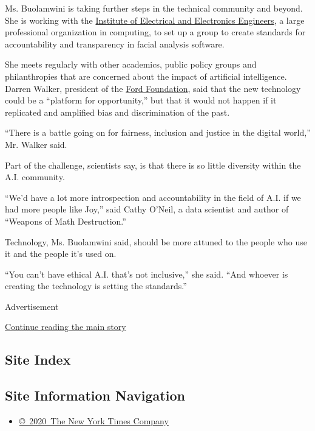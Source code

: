 Ms. Buolamwini is taking further steps in the technical community and
beyond. She is working with the
\href{https://www.ieee.org/index.html}{Institute of Electrical and
Electronics Engineers}, a large professional organization in computing,
to set up a group to create standards for accountability and
transparency in facial analysis software.

She meets regularly with other academics, public policy groups and
philanthropies that are concerned about the impact of artificial
intelligence. Darren Walker, president of the
\href{https://www.fordfoundation.org/}{Ford Foundation}, said that the
new technology could be a ``platform for opportunity,'' but that it
would not happen if it replicated and amplified bias and discrimination
of the past.

``There is a battle going on for fairness, inclusion and justice in the
digital world,'' Mr. Walker said.

Part of the challenge, scientists say, is that there is so little
diversity within the A.I. community.

``We'd have a lot more introspection and accountability in the field of
A.I. if we had more people like Joy,'' said Cathy O'Neil, a data
scientist and author of ``Weapons of Math Destruction.''

Technology, Ms. Buolamwini said, should be more attuned to the people
who use it and the people it's used on.

``You can't have ethical A.I. that's not inclusive,'' she said. ``And
whoever is creating the technology is setting the standards.''

Advertisement

\protect\hyperlink{after-bottom}{Continue reading the main story}

\hypertarget{site-index}{%
\subsection{Site Index}\label{site-index}}

\hypertarget{site-information-navigation}{%
\subsection{Site Information
Navigation}\label{site-information-navigation}}

\begin{itemize}
\tightlist
\item
  \href{https://help.nytimes.com/hc/en-us/articles/115014792127-Copyright-notice}{©~2020~The
  New York Times Company}
\end{itemize}

